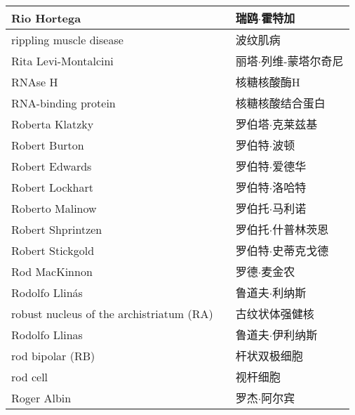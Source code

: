 \begin{longtable}{lll}
	\midrule
	Rio Hortega   && 瑞鸥$\cdot$霍特加  \\
	
	\midrule
	rippling muscle disease   && 波纹肌病  \\
	
	\midrule
	Rita Levi-Montalcini   && 丽塔$\cdot$列维-蒙塔尔奇尼  \\
	
	\midrule
	RNAse H   && 核糖核酸酶H  \\
	
	\midrule
	RNA-binding protein   && 核糖核酸结合蛋白  \\
	
	\midrule
	Roberta Klatzky   && 罗伯塔$\cdot$克莱兹基  \\
	
	\midrule
	Robert Burton   && 罗伯特$\cdot$波顿  \\
	
	\midrule
	Robert Edwards   && 罗伯特$\cdot$爱德华  \\
	
	\midrule
	Robert Lockhart   && 罗伯特$\cdot$洛哈特  \\
	
	\midrule
	Roberto Malinow   && 罗伯托$\cdot$马利诺  \\
	
	\midrule
	Robert Shprintzen   && 罗伯托$\cdot$什普林茨恩  \\
	
	\midrule
	Robert Stickgold   && 罗伯特$\cdot$史蒂克戈德  \\
	
	\midrule
	Rod MacKinnon   && 罗德$\cdot$麦金农  \\
	
	\midrule
	Rodolfo Llinás   && 鲁道夫$\cdot$利纳斯  \\
	
	\midrule
	robust nucleus of the archistriatum (RA)   && 古纹状体强健核  \\
	
	\midrule
	Rodolfo Llinas   && 鲁道夫$\cdot$伊利纳斯  \\
	
	\midrule
	rod bipolar (RB)  && 杆状双极细胞  \\
	
	\midrule
	rod cell   && 视杆细胞  \\
	
	\midrule
	Roger Albin   && 罗杰$\cdot$阿尔宾  \\
	

\end{longtable}
